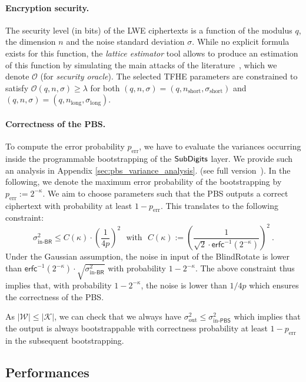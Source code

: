 \paragraph{Encryption security.} 
The security level (in bits) of the LWE ciphertexts is a function of the modulus $q$, the dimension $n$ and the noise standard deviation $\sigma$. While no explicit formula exists for this function, the \emph{lattice estimator} tool allows to produce an estimation of this function by simulating the main attacks of the literature~\cite{lattice-estimator}, which we denote $\mathcal{O}$ (for \emph{security oracle}). The selected TFHE parameters are constrained to satisfy $\mathcal{O}(q,n,\sigma) \geq \lambda$ for both $(q,n,\sigma) = (q,n_{\text{short}},\sigma_{\text{short}})$ and $(q,n,\sigma) = (q,n_{\text{long}},\sigma_{\text{long}})$.



\paragraph{Correctness of the PBS.} To compute the error probability $p_{\text{err}}$, we have to evaluate the variances occurring inside the programmable bootstrapping of the $\text{\textsf{SubDigits}}$ layer\ifeprint. We provide such an analysis in Appendix \ref{sec:pbs_variance_analysis}. \else (see full version~\cite{EPRINT:BBBBCL25}).\fi
In the following, we denote the maximum error probability of the bootstrapping by $p_{\text{err}} := 2^{-\kappa}$. We aim to choose parameters such that the PBS outputs a correct ciphertext with probability at least $1-p_{\text{err}}$. This translates to the following constraint:
$$\sigma^2_{\text{in-}\textsf{BR}} \leq  C(\kappa) \cdot \left(\frac1{4p}\right)^2 ~~~\text{with}~~~C(\kappa) := \left(\frac{1}{\sqrt{2} \cdot \mathsf{erfc}^{-1}(2^{-\kappa})}\right)^2 ~.$$
Under the Gaussian assumption, the noise in input of the \textsf{BlindRotate} is lower than $\mathsf{erfc}^{-1}(2^{-\kappa}) \cdot \sqrt{\sigma^2_{\text{in-}\textsf{BR}}}$ with probability $1-2^{-\kappa}$. The above constraint thus implies that, with probability $1-2^{-\kappa}$, the noise is lower than $1/{4p}$ which ensures the correctness of the PBS. 

As $|\mathcal W| \leq |\mathcal K|$, we can check that we always have $\sigma^2_{\text{out}} \leq \sigma^2_{\text{in-}\textsf{PBS}}$ which implies that the output is always bootstrappable with correctness probability at least $1-p_{\text{err}}$ in the subsequent bootstrapping.


\subsection{Performances} \label{sec:performances}

